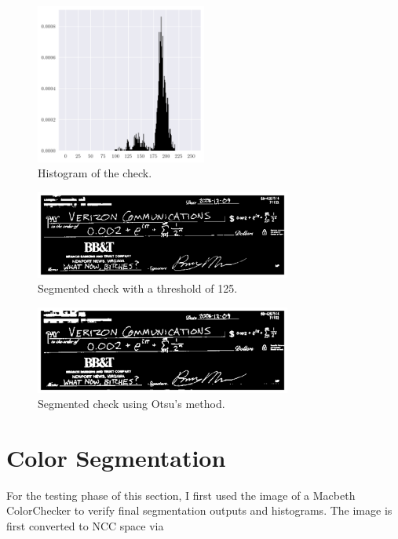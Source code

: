 \documentclass[12pt,a4paper]{article}
\begin{document}
\begin{figure}[htb]
	\centering
	\includegraphics[width=0.5\textwidth]{check_hist.png}
	\caption{Histogram of the check.}
	\label{fig:check-hist}
\end{figure}

\begin{figure}[htb]
	\centering
	\includegraphics[width=0.75\textwidth]{check_thres125.png}
	\caption{Segmented check with a threshold of 125.}
	\label{fig:check-thres}
\end{figure}

\begin{figure}[htb]
	\centering
	\includegraphics[width=0.75\textwidth]{check_otsu.png}
	\caption{Segmented check using Otsu's method.}
	\label{fig:check-otsu}
\end{figure}

\clearpage
\section*{Color Segmentation}
\setcounter{section}{1}

For the testing phase of this section, I first used the image of a Macbeth ColorChecker to verify final segmentation outputs and histograms. The image is first converted to NCC space via \cite{soriano}
\end{document}
